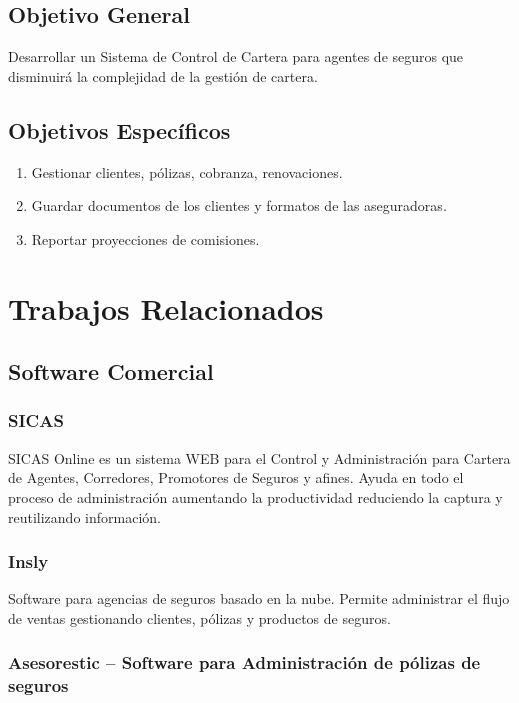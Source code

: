 \subsection*{Objetivo General}
Desarrollar un Sistema de Control de Cartera para agentes de seguros que disminuirá la complejidad de la gestión de cartera.
\subsection*{Objetivos Específicos}
\begin{enumerate}
	\item Gestionar clientes, pólizas, cobranza, renovaciones.
	\item Guardar documentos de los clientes y formatos de las aseguradoras.
	\item Reportar proyecciones de comisiones.
\end{enumerate}

\section{Trabajos Relacionados}
\subsection*{Software Comercial}
\subsubsection*{SICAS \cite{www:sicas}} 

SICAS Online es un sistema WEB para el Control y Administración para Cartera de Agentes, Corredores, Promotores de Seguros y afines. Ayuda en todo el proceso de administración aumentando la productividad reduciendo la captura y reutilizando información.

\subsubsection*{Insly \cite{www:insly}}

Software para agencias de seguros basado en la nube. Permite administrar el flujo de ventas gestionando clientes, pólizas y productos de seguros.

\subsubsection*{Asesorestic – Software para Administración de pólizas de seguros \cite{www:asesorestic}}

